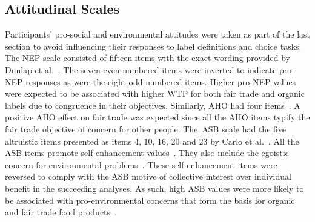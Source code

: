 \documentclass[sustainability,article,accept,moreauthors,pdftex,10pt,a4paper]{Definitions/mdpi}
\theoremstyle{mdpi}
\newcounter{ex}
\newcounter{re}
\theoremstyle{mdpidefinition}
\begin{document}
\subsection{Attitudinal Scales}\label{attscales}
\par{Participants' pro-social and environmental attitudes were taken as part of the last section to avoid influencing their responses to label definitions and choice tasks. The NEP scale consisted of fifteen items with the exact wording provided by Dunlap et al.~\cite{Dunlap2000}. The seven even-numbered items were inverted to indicate pro-NEP responses as were the eight odd-numbered items. Higher pro-NEP values were expected to be associated with higher WTP for both fair trade and organic labels due to congruence in their objectives. Similarly, AHO had four items~\cite{Webb2000}. A positive AHO effect on fair trade was expected since all the AHO items typify the fair trade objective of concern for other people. The~ASB scale had the five altruistic items presented as items 4, 10, 16, 20 and 23 by Carlo et al.~\cite{carlo2002, carlo2003}. All the ASB items promote self-enhancement values~\cite{DeDominicis2017}. They also include the egoistic concern for environmental problems~\cite{Schultz2000, WesleySchultz2001}. These self-enhancement items were reversed to comply with the ASB motive of collective interest over individual benefit in the succeeding analyses. As such, high ASB values were more likely to be associated with pro-environmental concerns that form the basis for organic and fair trade food products~\cite{Schultz2000, WesleySchultz2001}.}
\end{document}

